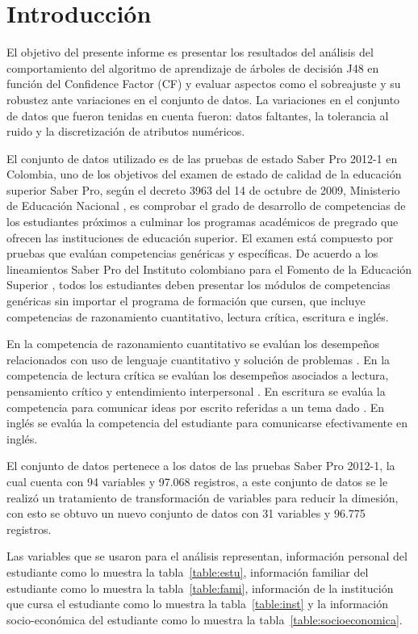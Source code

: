 \section{Introducción}

El objetivo del presente informe es presentar los resultados del análisis del
comportamiento del algoritmo de aprendizaje de árboles de decisión J48 en función del
Confidence Factor (CF) y evaluar aspectos como el sobreajuste y su robustez ante
variaciones en el conjunto de datos. La variaciones en el conjunto de datos que fueron 
tenidas en cuenta fueron: datos faltantes, la tolerancia al ruido y la
discretización de atributos numéricos.

El conjunto de datos utilizado es de las pruebas de estado Saber Pro 2012-1 en Colombia,
uno de los objetivos del examen de estado de calidad de la educación superior Saber
Pro, según el decreto 3963 del 14 de octubre de 2009, Ministerio de Educación
Nacional \cite{men2009}, es comprobar el grado de desarrollo de competencias de los
estudiantes próximos a culminar los programas académicos de pregrado que ofrecen
las instituciones de educación superior. El examen está compuesto por pruebas que
evalúan competencias genéricas y específicas. De acuerdo a los lineamientos Saber
Pro del Instituto colombiano para el Fomento de la Educación Superior \cite{icfes2011},
todos los estudiantes deben presentar los módulos de competencias genéricas sin
importar el programa de formación que cursen, que incluye competencias de
razonamiento cuantitativo, lectura crítica, escritura e inglés.

En la competencia de razonamiento cuantitativo se evalúan los desempeños
relacionados con uso de lenguaje cuantitativo y solución de problemas \cite{icfes2012a}.
En la competencia de lectura crítica se evalúan los desempeños asociados a lectura,
pensamiento crítico y entendimiento interpersonal \cite{icfes2012a}. En escritura se
evalúa la competencia para comunicar ideas por escrito referidas a un tema dado
\cite{icfes2011} \cite{icfes2012a}. En inglés se evalúa la competencia del estudiante para
comunicarse efectivamente en inglés.

El conjunto de datos pertenece a los datos de las pruebas Saber Pro 2012-1, la cual cuenta con
94 variables y 97.068 registros, a este conjunto de datos se le realizó un tratamiento de transformación
de variables para reducir la dimesión, con esto se obtuvo un nuevo conjunto de datos con 31 variables y
96.775 registros. 

Las variables que se usaron para el análisis representan, información personal del estudiante como lo muestra
la tabla~\ref{table:estu}, información familiar del estudiante  como lo muestra la tabla~\ref{table:fami},
información de la institución que cursa el estudiante como lo muestra la tabla~\ref{table:inst} y la información socio-económica
del estudiante como lo muestra la tabla~\ref{table:socioeconomica}.



